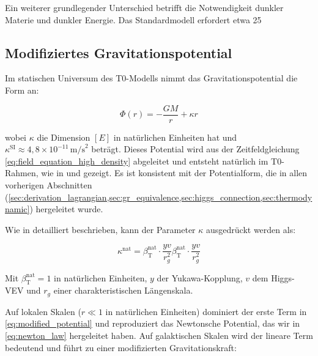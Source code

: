 \documentclass[12pt,a4paper]{article}
\newcommand{\betaT}{\beta_{\text{T}}}
\begin{document}
	Ein weiterer grundlegender Unterschied betrifft die Notwendigkeit dunkler Materie und dunkler Energie. Das Standardmodell erfordert etwa 25%
	
	\subsection{Modifiziertes Gravitationspotential}
	\label{subsec:modified_potential}
	Im statischen Universum des T0-Modells nimmt das Gravitationspotential die Form an:
	
	\begin{equation}
		\label{eq:modified_potential}
		\Phi(r) = -\frac{GM}{r} + \kappa r
	\end{equation}
	
	wobei \(\kappa\) die Dimension \([E]\) in natürlichen Einheiten hat und \(\kappa^{\text{SI}} \approx 4,8 \times 10^{-11} \, \text{m/s}^2\) beträgt. Dieses Potential wird aus der Zeitfeldgleichung \cref{eq:field_equation_high_density} abgeleitet und entsteht natürlich im T0-Rahmen, wie in \cite{pascher_params_2025} und \cite{pascher_galaxies_2025} gezeigt. Es ist konsistent mit der Potentialform, die in allen vorherigen Abschnitten (\cref{sec:derivation_lagrangian,sec:gr_equivalence,sec:higgs_connection,sec:thermodynamic}) hergeleitet wurde.
	
	Wie in \cite{pascher_params_2025} detailliert beschrieben, kann der Parameter \(\kappa\) ausgedrückt werden als:
	
	\begin{equation}
		\label{eq:kappa_betaT}
		\kappa^{\text{nat}} = \betaT^{\text{nat}} \cdot \frac{yv}{r_g^2}\betaT^{\text{nat}} \cdot \frac{yv}{r_g^2}
	\end{equation}
	
	Mit \(\betaT^{\text{nat}} = 1\) in natürlichen Einheiten, \(y\) der Yukawa-Kopplung, \(v\) dem Higgs-VEV und \(r_g\) einer charakteristischen Längenskala.
	
	Auf lokalen Skalen (\(r \ll 1\) in natürlichen Einheiten) dominiert der erste Term in \cref{eq:modified_potential} und reproduziert das Newtonsche Potential, das wir in \cref{eq:newton_law} hergeleitet haben. Auf galaktischen Skalen wird der lineare Term bedeutend und führt zu einer modifizierten Gravitationskraft:
	
\end{document}
